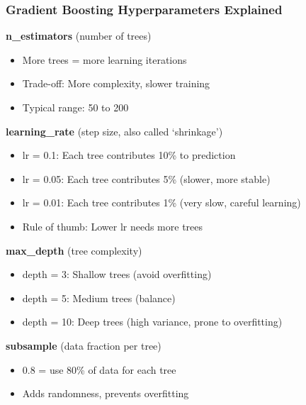 \documentclass{beamer}
\begin{document}
\begin{frame}[fragile]
\frametitle{Gradient Boosting Hyperparameters Explained}

\textbf{n\_estimators} (number of trees)
\begin{itemize}
    \item More trees = more learning iterations
    \item Trade-off: More complexity, slower training
    \item Typical range: 50 to 200
\end{itemize}

\vspace{0.2cm}
\textbf{learning\_rate} (step size, also called `shrinkage')
\begin{itemize}
    \item lr = 0.1: Each tree contributes 10\% to prediction
    \item lr = 0.05: Each tree contributes 5\% (slower, more stable)
    \item lr = 0.01: Each tree contributes 1\% (very slow, careful learning)
    \item Rule of thumb: Lower lr needs more trees
\end{itemize}

\vspace{0.2cm}
\textbf{max\_depth} (tree complexity)
\begin{itemize}
    \item depth = 3: Shallow trees (avoid overfitting)
    \item depth = 5: Medium trees (balance)
    \item depth = 10: Deep trees (high variance, prone to overfitting)
\end{itemize}

\vspace{0.2cm}
\textbf{subsample} (data fraction per tree)
\begin{itemize}
    \item 0.8 = use 80\% of data for each tree
    \item Adds randomness, prevents overfitting
\end{itemize}

\end{frame}
\end{document}
